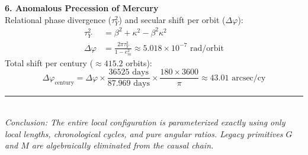 \documentclass[11pt, a4paper]{article}
\begin{document}
\noindent \textbf{6. Anomalous Precession of Mercury} \\
Relational phase divergence ($\tau_Y^2$) and secular shift per orbit ($\Delta\varphi$):
\begin{align}
    \tau_Y^2 &= \beta^2 + \kappa^2 - \beta^2\kappa^2 \\
    \Delta\varphi &= \frac{2\pi \tau_Y^2}{1-e_m^2} \approx 5.018 \times 10^{-7} \text{ rad/orbit}
\end{align}
Total shift per century ($\approx 415.2$ orbits):
\begin{equation}
    \Delta\varphi_{\text{century}} = \Delta\varphi \times \frac{36525 \text{ days}}{87.969 \text{ days}} \times \frac{180 \times 3600}{\pi} \approx 43.01 \text{ arcsec/cy}
\end{equation}

\vspace{0.5cm}
\noindent \rule{\textwidth}{0.4pt} \\
\textit{Conclusion: The entire local configuration is parameterized exactly using only local lengths, chronological cycles, and pure angular ratios. Legacy primitives $G$ and $M$ are algebraically eliminated from the causal chain.}
\end{document}
